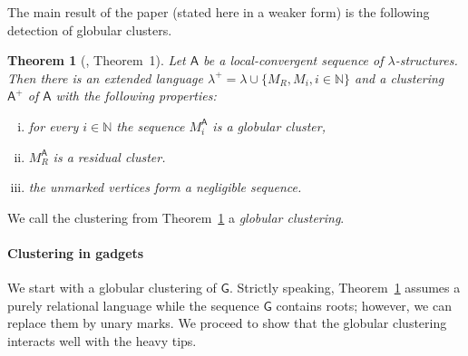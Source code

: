 \documentclass[11pt]{article}
\theoremstyle{plain}
\newtheorem{theorem}{Theorem}[section]
\theoremstyle{definition}
\theoremstyle{remark}
\newcommand{\N}{\mathbb{N}}
\newcommand{\strseq}[1]{{\boldsymbol{\mathsf{#1}}}}
\begin{document}
The main result of the paper (stated here in a weaker form) is the following detection of globular clusters.

\begin{theorem}[\cite{clustering}, Theorem~1]\label{thm:clustering}
    Let $\strseq{A}$ be a local-convergent sequence of $\lambda$-structures.
    Then there is an extended language $\lambda^+ = \lambda \cup \{M_R, M_i, i \in \N\}$ and a clustering $\strseq{A}^+$ of $\strseq{A}$ with the following properties:
    \begin{enumerate}[(i)]
        \item for every $i \in \N$ the sequence $M_i^{\strseq{A}}$ is a globular cluster,
        \item $M_R^{\strseq{A}}$ is a residual cluster.
        \item the unmarked vertices form a negligible sequence.
    \end{enumerate}
\end{theorem}

We call the clustering from Theorem~\ref{thm:clustering} a \emph{globular clustering}.

\paragraph{Clustering in gadgets}\label{par:clusteting_in_gadgets}

We start with a globular clustering of $\strseq{G}$.
Strictly speaking, Theorem~\ref{thm:clustering} assumes a purely relational language while the sequence $\strseq{G}$ contains roots; however, we can replace them by unary marks.
We proceed to show that the globular clustering interacts well with the heavy tips.
\end{document}
